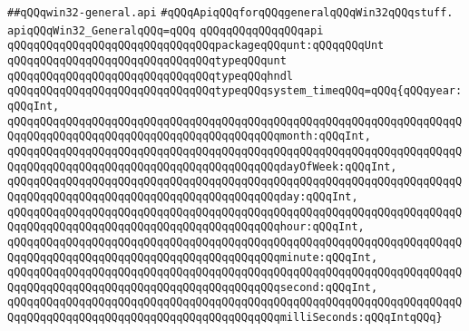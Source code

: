 \label{src/lib/std/src/win32/win32-general.api}
\verb|##qQQqwin32-general.api|\newline
\newline
\newline
\newline
\newline
\verb|#qQQqApiqQQqforqQQqgeneralqQQqWin32qQQqstuff.|\newline
\newline
\newline
\newline
\verb|apiqQQqWin32_GeneralqQQq=qQQq|\newline
\verb|qQQqqQQqqQQqqQQqapi|\newline
\verb|qQQqqQQqqQQqqQQqqQQqqQQqqQQqqQQqpackageqQQqunt:qQQqqQQqUnt|\newline
\newline
\verb|qQQqqQQqqQQqqQQqqQQqqQQqqQQqqQQqtypeqQQqunt|\newline
\newline
\verb|qQQqqQQqqQQqqQQqqQQqqQQqqQQqqQQqtypeqQQqhndl|\newline
\verb|qQQqqQQqqQQqqQQqqQQqqQQqqQQqqQQqtypeqQQqsystem_timeqQQq=qQQq{qQQqyear:qQQqInt,|\newline
\verb|qQQqqQQqqQQqqQQqqQQqqQQqqQQqqQQqqQQqqQQqqQQqqQQqqQQqqQQqqQQqqQQqqQQqqQQqqQQqqQQqqQQqqQQqqQQqqQQqqQQqqQQqqQQqqQQqmonth:qQQqInt,|\newline
\verb|qQQqqQQqqQQqqQQqqQQqqQQqqQQqqQQqqQQqqQQqqQQqqQQqqQQqqQQqqQQqqQQqqQQqqQQqqQQqqQQqqQQqqQQqqQQqqQQqqQQqqQQqqQQqqQQqdayOfWeek:qQQqInt,|\newline
\verb|qQQqqQQqqQQqqQQqqQQqqQQqqQQqqQQqqQQqqQQqqQQqqQQqqQQqqQQqqQQqqQQqqQQqqQQqqQQqqQQqqQQqqQQqqQQqqQQqqQQqqQQqqQQqqQQqday:qQQqInt,|\newline
\verb|qQQqqQQqqQQqqQQqqQQqqQQqqQQqqQQqqQQqqQQqqQQqqQQqqQQqqQQqqQQqqQQqqQQqqQQqqQQqqQQqqQQqqQQqqQQqqQQqqQQqqQQqqQQqqQQqhour:qQQqInt,|\newline
\verb|qQQqqQQqqQQqqQQqqQQqqQQqqQQqqQQqqQQqqQQqqQQqqQQqqQQqqQQqqQQqqQQqqQQqqQQqqQQqqQQqqQQqqQQqqQQqqQQqqQQqqQQqqQQqqQQqminute:qQQqInt,|\newline
\verb|qQQqqQQqqQQqqQQqqQQqqQQqqQQqqQQqqQQqqQQqqQQqqQQqqQQqqQQqqQQqqQQqqQQqqQQqqQQqqQQqqQQqqQQqqQQqqQQqqQQqqQQqqQQqqQQqsecond:qQQqInt,|\newline
\verb|qQQqqQQqqQQqqQQqqQQqqQQqqQQqqQQqqQQqqQQqqQQqqQQqqQQqqQQqqQQqqQQqqQQqqQQqqQQqqQQqqQQqqQQqqQQqqQQqqQQqqQQqqQQqqQQqmilliSeconds:qQQqIntqQQq}|\newline
\newline
